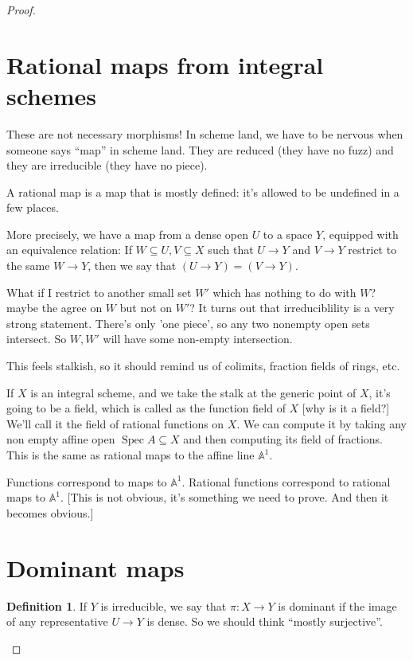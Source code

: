 \documentclass{book}
\newcommand{\A}{\ensuremath{\mathbb{A}}}
\newcommand{\spec}{\operatorname{Spec}}
\theoremstyle{definition}
\newtheorem{definition}[theorem]{Definition}
\begin{document}
\begin{proof}
\section{Rational maps from integral schemes}
These are not necessary morphisms! In scheme land, we have to be nervous when
someone says ``map'' in scheme land.  They are reduced (they have no fuzz) and
they are irreducible (they have no piece).

A rational map is a map that is mostly defined: it's allowed to be undefined
in a few places.

More precisely, we have a map from a dense open $U$ to a space $Y$, equipped
with an equivalence relation: If $W \subseteq U, V \subseteq X$ such that
$U \rightarrow Y$ and $V \rightarrow Y$ restrict to the same $W \rightarrow Y$,
then we say that $(U \rightarrow Y) = (V \rightarrow Y)$.

What if I restrict to another small set $W'$ which has nothing to do with $W$?
maybe the agree on $W$ but not on $W'$? It turns out that irreduciblility is
a very strong statement. There's only 'one piece', so any two nonempty open
sets intersect. So $W, W'$ will have some non-empty intersection.

This feels stalkish, so it should remind us of colimits, fraction fields of
rings, etc.


If $X$ is an integral scheme, and we take the stalk at the generic point of $X$,
it's going to be a field, which is called as the function field of $X$
[why is it a field?] We'll call it the field of rational functions on $X$.
We can compute it by taking any non empty affine open $\spec A \subseteq X$
and then computing its field of fractions. This is the same as rational maps
to the affine line $\A^1$.

Functions correspond to maps to $\A^1$. Rational functions correspond to
rational maps to $\A^1$. [This is not obvious, it's something we need to prove.
And then it becomes obvious.]

\section{Dominant maps}

\begin{definition}
If $Y$ is irreducible, we say that $\pi: X \rightarrow Y$ is dominant if the
image of any representative $U \rightarrow Y$ is dense. So we should think
``mostly surjective''.
\end{definition}


\end{proof}
\end{document}
